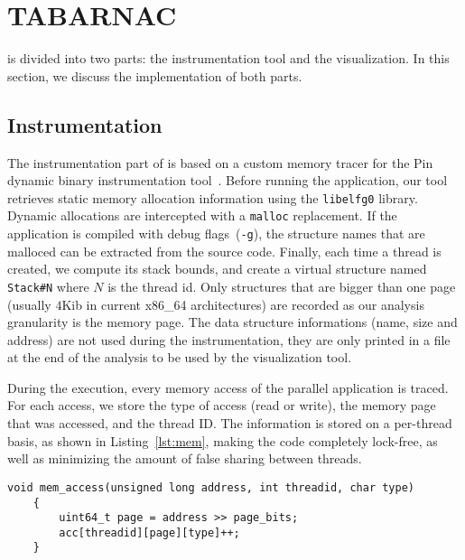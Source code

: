 
\section{TABARNAC}
\label{sec:design}

\TABARNAC is divided into two parts: the instrumentation tool and the
visualization. In this section, we discuss the implementation of both parts.

\subsection{Instrumentation}
\label{sec:design-impl}

The instrumentation part of \TABARNAC is based on a custom memory tracer for the Pin dynamic binary instrumentation tool~\cite{Luk05Pin}.
Before running the application, our tool retrieves static memory allocation
information using the \texttt{libelfg0} library. Dynamic allocations are
intercepted with a \texttt{malloc} replacement. If the application is
compiled with debug flags~(\texttt{-g}), the structure names that are malloced can be extracted from the source
code. Finally, each time a thread is created, we compute
its stack bounds, and create a virtual structure named \texttt{Stack\#N} where
$N$ is the thread id. Only structures that are bigger than one page (usually
$4$Kib in current x86\_64 architectures) are recorded as our
analysis granularity is the memory page. The data structure informations (name,
size and address) are not used during the instrumentation, they are only
printed in a file at the end of the analysis to be used by the visualization
tool.

During the execution, every memory access of the parallel application is traced.
For each access, we store the type of access (read or write), the memory page that was accessed, and the thread ID.
The information is stored on a per-thread basis, as shown in
Listing~\ref{lst:mem}, making the code completely lock-free, as well as minimizing the amount of false sharing between threads.

\begin{lstlisting}[caption={Code executed on each memory access. The \texttt{address}, \texttt{threadid} and \texttt{type} parameters are provided by Pin.},label=lst:mem]
	void mem_access(unsigned long address, int threadid, char type)
	{
		uint64_t page = address >> page_bits;
		acc[threadid][page][type]++;
	}

\end{lstlisting}


